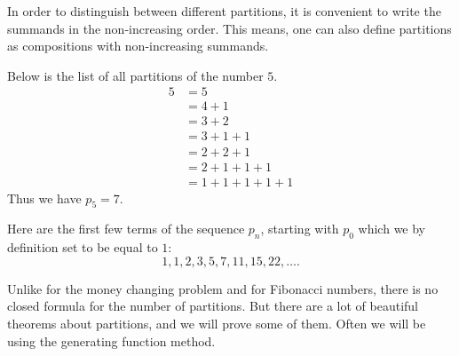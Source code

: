 \begin{page}
\setcounter{section}{3}
\setcounter{subsection}{4}
\setcounter{dfn}{3}
\label{portion:894}

In order to distinguish between different partitions, it is convenient to write the summands in the non-increasing order.
This means, one can also define partitions as compositions with non-increasing summands.


\end{page}

\begin{page}
\setcounter{section}{3}
\setcounter{subsection}{4}
\setcounter{dfn}{4}
\label{portion:896}

\begin{exl}
Below is the list of all partitions of the number $5$.
\begin{align*}
5 &= 5\\
&= 4+1\\
&= 3+2\\
&= 3+1+1\\
&= 2+2+1\\
&= 2+1+1+1\\
&= 1+1+1+1+1
\end{align*}
Thus we have $p_5=7$.
\end{exl}

\end{page}

\begin{page}
\setcounter{section}{3}
\setcounter{subsection}{4}
\setcounter{dfn}{4}
\label{portion:897}


Here are the first few terms of the sequence $p_n$, starting with $p_0$ which we by definition set to be equal to $1$:
\[
1, 1, 2, 3, 5, 7, 11, 15, 22, \ldots.
\]



Unlike for the money changing problem and for Fibonacci numbers, there is no closed formula for the number of partitions.
But there are a lot of beautiful theorems about partitions, and we will prove some of them.
Often we will be using the generating function method.


\end{page}

